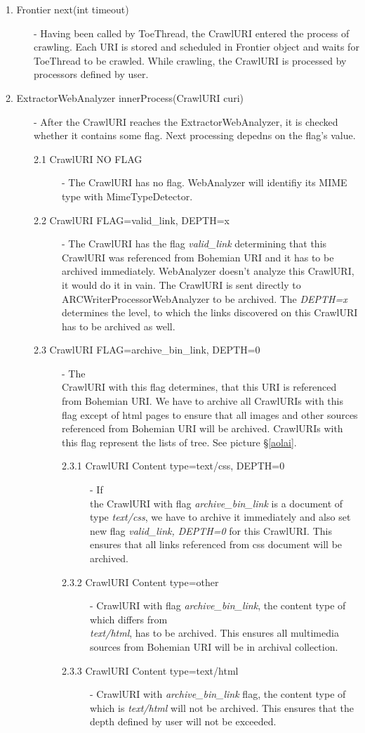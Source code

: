 \documentclass[11pt,a4paper]{article}
\begin{document}
\begin{description}
\item[1. Frontier next(int timeout)] - Having been called by ToeThread, the CrawlURI entered the process of crawling. Each URI is stored and scheduled in Frontier object and waits for ToeThread to be crawled. While crawling, the CrawlURI is processed by processors defined by user.
\item[2. ExtractorWebAnalyzer innerProcess(CrawlURI curi)] - After the CrawlURI reaches the ExtractorWebAnalyzer, it is checked whether it contains some flag. Next processing depedns on the flag's value.

\begin{description}
\item[2.1 CrawlURI NO FLAG] - The CrawlURI has no flag. WebAnalyzer will identifiy its MIME type with MimeTypeDetector.
\item[2.2 CrawlURI FLAG=valid\_link, DEPTH=x] - The CrawlURI has the flag \emph{valid\_link} determining that this CrawlURI was re\-fe\-ren\-ced from Bohemian URI and it has to be archived immediately. WebAnalyzer doesn't analyze this CrawlURI, it would do it in vain. The CrawlURI is sent directly to ARCWriterProcessorWebAnalyzer to be archived. The \emph{DEPTH=x} determines the level, to which the links discovered on this CrawlURI has to be archived as well.
\item[2.3 CrawlURI FLAG=archive\_bin\_link, DEPTH=0] - The \\CrawlURI with this flag determines, that this URI is referenced from Bohemian URI. We have to archive all CrawlURIs with this flag except of html pages to ensure that all images and other sources referenced from Bohemian URI will be archived. Crawl\-URI\-s with this flag represent the lists of tree. See picture \S\ref{aolai}.

\begin{description}
\item[2.3.1 CrawlURI Content type=text/css, DEPTH=0] - If \\the CrawlURI with flag \emph{archive\_bin\_link} is a document of type \emph{text/css}, we have to archive it immediately and also set new flag \emph{valid\_link, DEPTH=0} for this CrawlURI. This ensures that all links referenced from css document will be archived. 
\item[2.3.2 CrawlURI Content type=other] - CrawlURI with flag \emph{archive\_bin\_link}, the content type of which differs from \\ \emph{text/html}, has to be archived. This ensures all multimedia sources from Bohemian URI will be in archival collection.
\item[2.3.3 CrawlURI Content type=text/html] - CrawlURI with \emph{archive\_bin\_link} flag, the content type of which is \emph{text/html} will not be archived. This ensures that the depth defined by user will not be exceeded.
\end{description}
\end{description}



\end{description}
\end{document}
